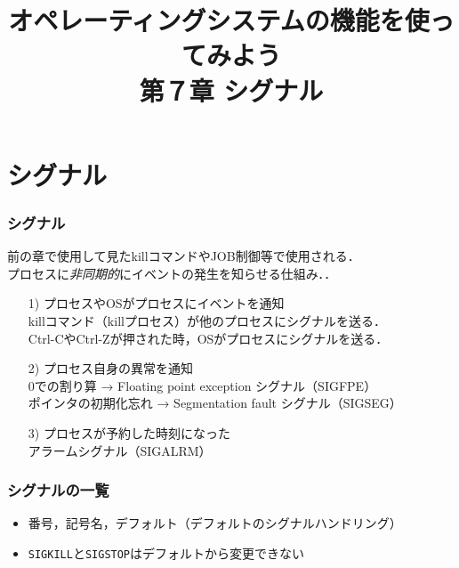 \documentclass{beamer}                 %
\begin{document}
\title{オペレーティングシステムの機能を使ってみよう\\
第７章 シグナル}
\date{}

\begin{frame}
  \titlepage
\end{frame}


\section{シグナル}
\begin{frame}[fragile]
  \frametitle{シグナル}
  前の章で使用して見たkillコマンドやJOB制御等で使用される．\\
  プロセスに\emph{非同期的}にイベントの発生を知らせる仕組み．．

  \begin{enumerate}
    \item[1)] プロセスやOSがプロセスにイベントを通知 \\
      killコマンド（killプロセス）が他のプロセスにシグナルを送る．\\
      Ctrl-CやCtrl-Zが押された時，OSがプロセスにシグナルを送る．
    \item[2)] プロセス自身の異常を通知 \\
      0での割り算 → Floating point exception シグナル（SIGFPE） \\
      ポインタの初期化忘れ → Segmentation fault シグナル（SIGSEG）
    \item[3)] プロセスが予約した時刻になった \\
      アラームシグナル（SIGALRM）
  \end{enumerate}
\end{frame}

\begin{frame}[fragile]
  \frametitle{シグナルの一覧}

  \begin{itemize}
  \item 番号，記号名，デフォルト（デフォルトのシグナルハンドリング）
  \item \texttt{SIGKILL}と\texttt{SIGSTOP}はデフォルトから変更できない
  \end{itemize}
\end{frame}
\end{document}

